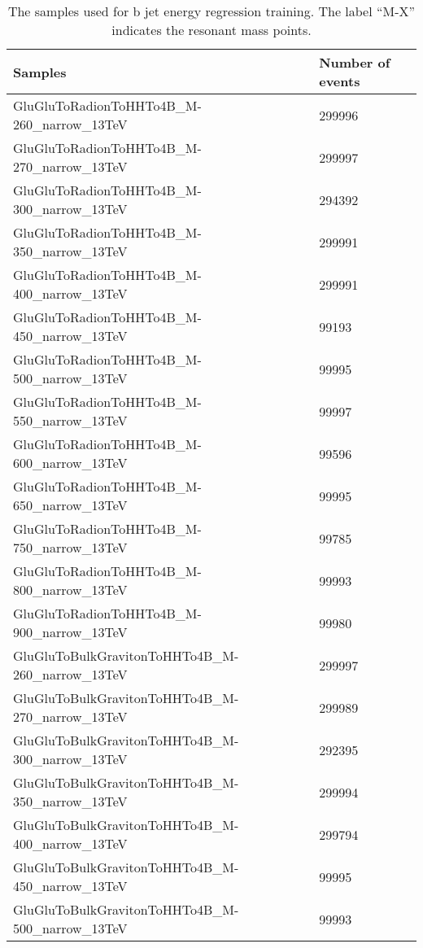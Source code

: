\begin{table}[h]
\caption{The samples used for b jet energy regression training. The label ``M-X'' indicates the resonant mass points.}
\centering
\begin{tabular}{ll}
\hline
Samples                                            & Number of events \\ \hline
GluGluToRadionToHHTo4B\_M-260\_narrow\_13TeV       & 299996           \\
GluGluToRadionToHHTo4B\_M-270\_narrow\_13TeV       & 299997           \\
GluGluToRadionToHHTo4B\_M-300\_narrow\_13TeV       & 294392           \\
GluGluToRadionToHHTo4B\_M-350\_narrow\_13TeV       & 299991           \\
GluGluToRadionToHHTo4B\_M-400\_narrow\_13TeV       & 299991           \\
GluGluToRadionToHHTo4B\_M-450\_narrow\_13TeV       & 99193            \\
GluGluToRadionToHHTo4B\_M-500\_narrow\_13TeV       & 99995            \\
GluGluToRadionToHHTo4B\_M-550\_narrow\_13TeV       & 99997            \\
GluGluToRadionToHHTo4B\_M-600\_narrow\_13TeV       & 99596            \\
GluGluToRadionToHHTo4B\_M-650\_narrow\_13TeV       & 99995            \\
GluGluToRadionToHHTo4B\_M-750\_narrow\_13TeV       & 99785            \\
GluGluToRadionToHHTo4B\_M-800\_narrow\_13TeV       & 99993            \\
GluGluToRadionToHHTo4B\_M-900\_narrow\_13TeV       & 99980            \\
GluGluToBulkGravitonToHHTo4B\_M-260\_narrow\_13TeV & 299997           \\
GluGluToBulkGravitonToHHTo4B\_M-270\_narrow\_13TeV & 299989           \\
GluGluToBulkGravitonToHHTo4B\_M-300\_narrow\_13TeV & 292395           \\
GluGluToBulkGravitonToHHTo4B\_M-350\_narrow\_13TeV & 299994           \\
GluGluToBulkGravitonToHHTo4B\_M-400\_narrow\_13TeV & 299794           \\
GluGluToBulkGravitonToHHTo4B\_M-450\_narrow\_13TeV & 99995            \\
GluGluToBulkGravitonToHHTo4B\_M-500\_narrow\_13TeV & 99993            \\

\end{tabular}
\end{table}
